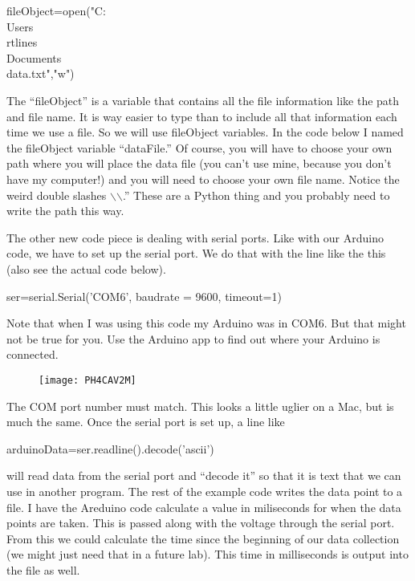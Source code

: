 \begin{python}
	fileObject=open("C:\\Users\\rtlines\\Documents\\data.txt","w")	
\end{python}
\vspace{.1in}

The ``fileObject'' is a variable that contains all the file information like the path and file name. It is way easier to type than to include all that information each time we use a file. So we will use fileObject variables. In the code below I named the fileObject variable ``dataFile.'' Of course, you will have to choose your own path where you will place the data file (you can't use mine, because you don't have my computer!) and you will need to choose your own file name. Notice the weird double slashes $\backslash$$\backslash$.'' These are a Python thing and you probably need to write the path this way.

The other new code piece is dealing with serial ports. Like with our Arduino code, we have to set up the serial port. We do that with the line like the this (also see the actual code below).

\vspace{.1in}
\begin{python}
	ser=serial.Serial('COM6', baudrate = 9600, timeout=1)
\end{python}
\vspace{.1in}

Note that when I was using this code my Arduino was in COM6. But that might not be true for you. Use the Arduino app to find out where your Arduino is connected. 

\begin{figure}[h!]
	\texttt{[image: PH4CAV2M]}
\end{figure}

The COM port number must match. This looks a little uglier on a Mac, but is much the same. Once the serial port is set up, a line like 

\vspace{.1in}
\begin{python}
	arduinoData=ser.readline().decode('ascii')
\end{python}
\vspace{.1in}

\noindent will read data from the serial port and ``decode it'' so that it is text that we can use in another program. The rest of the example code writes the data point to a file. I have the Areduino code calculate a value in miliseconds for when the data points are taken. This is passed along with the voltage through the serial port. From this we could calculate the time since the beginning of our data collection (we might just need that in a future lab). This time in milliseconds is output into the file as well.

